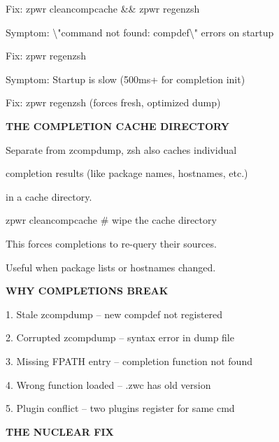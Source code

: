 \documentclass[11pt,a4paper,twoside]{book}
\begin{document}
\begin{codebox}
Fix:     zpwr cleancompcache \&\& zpwr regenzsh\\
\end{codebox}

Symptom: \textbackslash{}"command not found: compdef\textbackslash{}" errors on startup

\begin{codebox}
Fix:     zpwr regenzsh\\
\end{codebox}

Symptom: Startup is slow (500ms+ for completion init)

\begin{codebox}
Fix:     zpwr regenzsh (forces fresh, optimized dump)\\
\end{codebox}


\vspace{12pt}
{\bfseries\color{neonyellow} THE COMPLETION CACHE DIRECTORY}\vspace{4pt}

Separate from zcompdump, zsh also caches individual

completion results (like package names, hostnames, etc.)

in a cache directory.

\begin{codebox}
zpwr cleancompcache                 \# wipe the cache directory\\
\end{codebox}

This forces completions to re-query their sources.

Useful when package lists or hostnames changed.


\vspace{12pt}
{\bfseries\color{neonyellow} WHY COMPLETIONS BREAK}\vspace{4pt}

1. Stale zcompdump -- new compdef not registered

2. Corrupted zcompdump -- syntax error in dump file

3. Missing FPATH entry -- completion function not found

4. Wrong function loaded -- .zwc has old version

5. Plugin conflict -- two plugins register for same cmd


\vspace{12pt}
{\bfseries\color{neonyellow} THE NUCLEAR FIX}\vspace{4pt}
\end{document}
